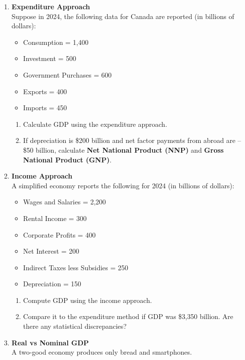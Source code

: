 \documentclass[12pt]{article}
\begin{document}
\begin{enumerate}
\item \textbf{Expenditure Approach} \\
Suppose in 2024, the following data for Canada are reported (in billions of dollars):  
\begin{itemize}
    \item Consumption = 1{,}400  
    \item Investment = 500  
    \item Government Purchases = 600  
    \item Exports = 400  
    \item Imports = 450  
\end{itemize}

\begin{enumerate}[label=(\alph*)]
    \item Calculate GDP using the expenditure approach.  
    \item If depreciation is \$200 billion and net factor payments from abroad are --\$50 billion, calculate \textbf{Net National Product (NNP)} and \textbf{Gross National Product (GNP)}.  
\end{enumerate}

\item \textbf{Income Approach} \\
A simplified economy reports the following for 2024 (in billions of dollars):  
\begin{itemize}
    \item Wages and Salaries = 2{,}200  
    \item Rental Income = 300  
    \item Corporate Profits = 400  
    \item Net Interest = 200  
    \item Indirect Taxes less Subsidies = 250  
    \item Depreciation = 150  
\end{itemize}

\begin{enumerate}[label=(\alph*)]
    \item Compute GDP using the income approach.  
    \item Compare it to the expenditure method if GDP was \$3{,}350 billion. Are there any statistical discrepancies?  
\end{enumerate}
\newpage
\item \textbf{Real vs Nominal GDP} \\
A two-good economy produces only bread and smartphones.  


\end{enumerate}
\end{document}
